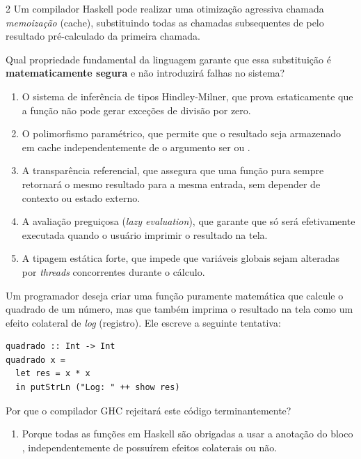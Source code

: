 \documentclass[a4paper,10pt,brazil]{article}
\begin{document}
\begin{multicols}{2}
Um compilador Haskell pode realizar uma otimização agressiva chamada \emph{memoização} (cache), substituindo todas as chamadas subsequentes de  pelo resultado pré-calculado da primeira chamada. 

Qual propriedade fundamental da linguagem garante que essa substituição é \textbf{matematicamente segura} e não introduzirá falhas no sistema?

\begin{enumerate}
  \item O sistema de inferência de tipos Hindley-Milner, que prova estaticamente que a função não pode gerar exceções de divisão por zero.

  \item O polimorfismo paramétrico, que permite que o resultado seja armazenado em cache independentemente de o argumento ser  ou .

  \item A transparência referencial, que assegura que uma função pura sempre retornará o mesmo resultado para a mesma entrada, sem depender de contexto ou estado externo.

  \item A avaliação preguiçosa (\emph{lazy evaluation}), que garante que  só será efetivamente executada quando o usuário imprimir o resultado na tela.

  \item A tipagem estática forte, que impede que variáveis globais sejam alteradas por \textit{threads} concorrentes durante o cálculo.


\end{enumerate}

Um programador deseja criar uma função puramente matemática que calcule o quadrado de um número, mas que também imprima o resultado na tela como um efeito colateral de \emph{log} (registro). Ele escreve a seguinte tentativa:

\begin{verbatim}
quadrado :: Int -> Int
quadrado x = 
  let res = x * x
  in putStrLn ("Log: " ++ show res)
\end{verbatim}

Por que o compilador GHC rejeitará este código terminantemente?

\begin{enumerate}
  \item Porque todas as funções em Haskell são obrigadas a usar a anotação do bloco , independentemente de possuírem efeitos colaterais ou não.


\end{enumerate}
\end{multicols}
\end{document}
